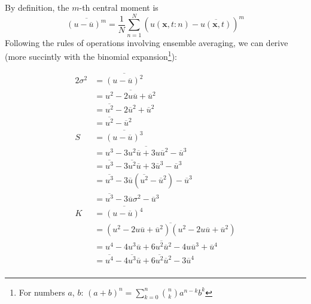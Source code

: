 \documentclass[a4paper]{article}
\begin{document}

By definition, the \(m\)-th central moment is
\[
	\overline{\!\left( u - \overline{u} \right)^{m}} = \frac{1}{N} \sum_{n=1}^{N} \!\left( u \!\left( \bm{x}, t : n \right) - \overline{u \!\left( \bm{x}, t \right) } \right)^{m}
\]
Following the rules of operations involving ensemble averaging, we can derive (more succintly with the binomial expansion\footnote{For numbers \(a\), \(b\): \( (a + b)^n = \sum_{k=0}^{n} \binom{n}{k} a^{n-k} b^k \)}):

\begin{alignat*}{2}
	\sigma^{2} & = \overline{\!\left(u - \overline{u} \right)^{2}} \\
	     & = \overline{u^{2} - 2u \overline{u} + \overline{u}^{2} } \\
	     & = \overline{u^{2}} - 2 \overline{u}^{2} + \overline{u}^{2}  \\
	     & = \boxed{ \overline{u^{2}} - \overline{u}^{2} } \\
	   S & = \overline{\!\left( u - \overline{u} \right)^{3} }  \\
	     & = \overline{u^{3} - 3u^{2}\overline{u} + 3u \overline{u}^{2} - \overline{u}^{3}} \\
	     & = \overline{u^{3}} - 3 \overline{u^{2}} \overline{u} + 3 \overline{u}^{3} - \overline{u}^{3} \\
	     & = \overline{u^{3}} - 3 \overline{u} \!\left( \overline{u^{2}} - \overline{u}^{2} \right) - \overline{u}^{3} \\
	     & = \boxed{ \overline{u^{3}} - 3 \overline{u} \sigma^{2} - \overline{u}^{3} } \\
	   K & = \overline{\!\left( u - \overline{u} \right)^{4}} \\
	     & = \overline{\!\left( u^{2} - 2u \overline{u} + \overline{u}^{2} \right) \!\left( u^{2} - 2u \overline{u} + \overline{u}^{2} \right) } \\
	     & = \overline{u^{4} - 4u^{3} \overline{u} + 6u^{2} \overline{u}^{2} - 4u \overline{u}^{3} + \overline{u}^{4}} \\
	     & = \boxed{ \overline{u^{4}} - 4 \overline{u^{3}} \overline{u} + 6 \overline{u^{2}} \overline{u}^{2} - 3 \overline{u}^{4} } \\
\end{alignat*}
\end{document}

